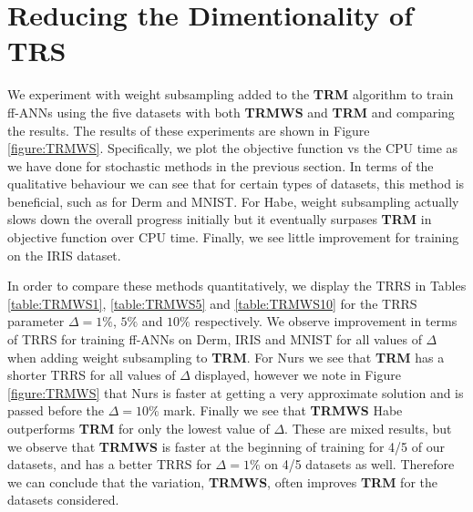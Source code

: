 \documentclass[letterpaper,12pt,titlepage,oneside,final]{book}
\begin{document}
	
	\section{Reducing the Dimentionality of TRS}
	
	We experiment with weight subsampling added to the \textbf{TRM} algorithm to train ff-ANNs using the five datasets with both \textbf{TRMWS} and \textbf{TRM} and comparing the results. The results of these experiments are shown in Figure \ref{figure:TRMWS}. Specifically, we plot the objective function vs the CPU time as we have done for stochastic methods in the previous section. In terms of the qualitative behaviour we can see that for certain types of datasets, this method is beneficial, such as for Derm and MNIST. For Habe, weight subsampling actually slows down the overall progress initially but it eventually surpases \textbf{TRM} in objective function over CPU time. Finally, we see little improvement for training on the IRIS dataset. 
	
	In order to compare these methods quantitatively, we display the TRRS in Tables \ref{table:TRMWS1}, \ref{table:TRMWS5} and \ref{table:TRMWS10} for the TRRS parameter $\Delta = 1\%$, $5\%$ and $10\%$ respectively. We observe improvement in terms of TRRS for training ff-ANNs on Derm, IRIS and MNIST for all values of $\Delta$ when adding weight subsampling to \textbf{TRM}. For Nurs we see that \textbf{TRM} has a shorter TRRS for all values of $\Delta$ displayed, however we note in Figure \ref{figure:TRMWS} that Nurs is faster at getting a very approximate solution and is passed before the $\Delta=10\%$ mark. Finally we see that \textbf{TRMWS} Habe outperforms \textbf{TRM} for only the lowest value of $\Delta$. These are mixed results, but we observe that \textbf{TRMWS} is faster at the beginning of training for 4/5 of our datasets, and has a better TRRS for $\Delta=1\%$ on 4/5 datasets as well. Therefore we can conclude that the variation, \textbf{TRMWS}, often improves \textbf{TRM} for the datasets considered.
	
\end{document}
